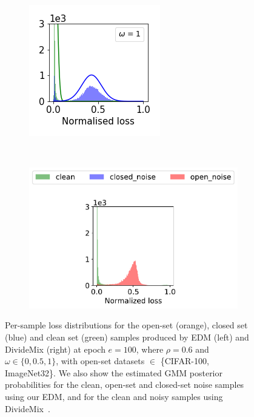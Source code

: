 \documentclass[12pt]{article}
\begin{document}
\begin{figure}[t]
\begin{subfigure}{.18\textwidth}
    \end{subfigure}
    \begin{subfigure}{.18\textwidth}
      \centering
      \includegraphics[width=\linewidth]{images/loss_dist/DM_0.6_0.00_imagenet32.png} 
    \end{subfigure}
    \\
    \begin{subfigure}{\textwidth}
      \centering
      \includegraphics[width=0.4\linewidth]{images/loss_dist/legend.pdf} 
    \end{subfigure}
    \caption{Per-sample loss distributions for the open-set (orange), closed set (blue) and clean set (green) samples produced by EDM (left) and DivideMix (right) at epoch $e=100$, where $\rho=0.6$ and $\omega \in \{0,0.5,1\}$, with open-set datasets $\in$ \{CIFAR-100, ImageNet32\}.  We also show the estimated GMM posterior probabilities for the clean, open-set and closed-set noise samples using our EDM, and for the clean and noisy samples using DivideMix~.}
    \label{fig5}
\end{figure}
\end{document}
